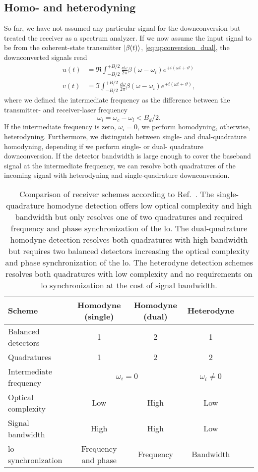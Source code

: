 \subsection{Homo- and heterodyning}

So far, we have not assumed any particular signal for the downconversion but treated the receiver as a spectrum analyzer.
If we now assume the input signal to be from the coherent-state transmitter $\lvert\beta(t)\rangle$, \cref{eq:upconversion_dual}, the downconverted signals read
\begin{align}
	u(t)
	&=
	\Re
	\int_{-B/2}^{+B/2}\frac{\dd{\omega}}{2\pi}
	\beta(\omega-\omega_i)
	e^{+i(\omega t+\vartheta)}
	\label{eq:receiver_demod_real}
	\\
	v(t)
	&=
	\Im
	\int_{-B/2}^{+B/2}\frac{\dd{\omega}}{2\pi}
	\beta(\omega-\omega_i)
	e^{+i(\omega t+\vartheta)}
	\label{eq:receiver_demod_imag}
	,
\end{align}
where we defined the intermediate frequency as the difference between the transmitter- and receiver-laser frequency
\begin{equation}
	\omega_i
	=
	\omega_c-\omega_l
	<
	B_d/2
	.
\end{equation}
If the intermediate frequency is zero, $\omega_i=0$, we perform homodyning, otherwise, heterodyning.
Furthermore, we distinguish between single- and dual-quadrature homodyning, depending if we perform single- or dual- quadrature downconversion.
If the detector bandwidth is large enough to cover the baseband signal at the intermediate frequency, we can resolve both quadratures of the incoming signal with heterodyning and single-quadrature downconversion.
\begin{table}[htb]
  \centering
  \begin{tabular}{lccccc}
    \toprule
    Scheme & Homodyne (single) & Homodyne (dual) & Heterodyne \\
    \midrule
    Balanced detectors & \num{1} & \num{2} & \num{1} \\
    Quadratures & \num{1} & \num{2} & \num{2} \\
    Intermediate frequency & \multicolumn{2}{c}{$\omega_i=0$} & $\omega_i\neq 0$ \\
    Optical complexity & Low & High & Low \\
    Signal bandwidth & High & High & Low \\
    \gls{lo} synchronization & Frequency and phase & Frequency & Bandwidth \\
    \bottomrule
  \end{tabular}
  \caption{Comparison of receiver schemes according to Ref.~\cite{Brunner2017}. The single-quadrature homodyne detection offers low optical complexity and high bandwidth but only resolves one of two quadratures and required frequency and phase synchronization of the \gls{lo}. The dual-quadrature homodyne detection resolves both quadratures with high bandwidth but requires two balanced detectors increasing the optical complexity and phase synchronization of the \gls{lo}. The heterodyne detection schemes resolves both quadratures with low complexity and no requirements on \gls{lo} synchronization at the cost of signal bandwidth.}\label{tab:receivers}
\end{table}
